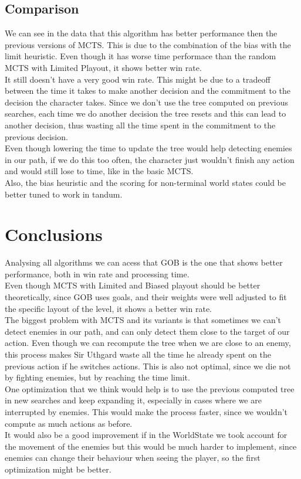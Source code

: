 \documentclass{article}
\begin{document}
  \subsection{Comparison}
  We can see in the data that this algorithm has better performance then the previous versions of MCTS. This is due to the combination of the bias with the limit heuristic.
  Even though it has worse time performace than the random MCTS with Limited Playout, it shows better win rate. \\
  It still doesn't have a very good win rate. This might be due to a tradeoff between the time it takes to make another decision and the commitment to the decision the
  character takes. Since we don't use the tree computed on previous searches, each time we do another decision the tree resets and this can lead to another decision,
  thus wasting all the time spent in the commitment to the previous decision.\\ 
  Even though lowering the time to update the tree would help detecting enemies in our path, if we do this too often, the character just wouldn't finish any action 
  and would still lose to time, like in the basic MCTS.\\
  Also, the bias heuristic and the scoring for non-terminal world states could be better tuned to work in tandum. \\

  \section{Conclusions}
  Analysing all algorithms we can acess that GOB is the one that shows better performance, both in win rate and processing time.\\
  Even though MCTS with Limited and Biased playout should be better theoretically, since GOB uses goals, and their weights were well adjusted to fit the 
  specific layout of the level, it shows a better win rate.\\
  The biggest problem with MCTS and its variants is that sometimes we can't detect enemies in our path, and can only detect them close to the target of our action.
  Even though we can recompute the tree when we are close to an enemy, this process makes Sir Uthgard waste all the time he already spent on the previous action if he switches
  actions. This is also not optimal, since we die not by fighting enemies, but by reaching the time limit.\\
  One optimization that we think would help is to use the previous computed tree in new searches and keep expanding it, especially in cases where we are interrupted by enemies. 
  This would make the process faster, since we wouldn't compute as much actions as before.\\
  It would also be a good improvement if in the WorldState we took account for the movement of the enemies but this would be much harder to implement, since enemies can
  change their behaviour when seeing the player, so the first optimization might be better.
\end{document}
